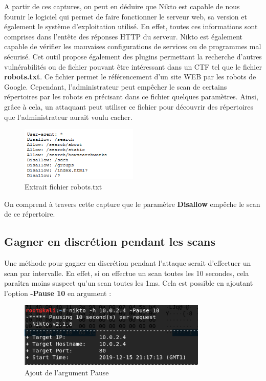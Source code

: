 A partir de ces captures, on peut en déduire que Nikto est capable de nous fournir le logiciel qui permet de faire fonctionner le serveur web, sa version et également le système d'exploitation utilisé. En effet, toutes ces informations sont comprises dans l'entête des réponses HTTP du serveur. Nikto est également capable de vérifier les mauvaises configurations de services ou de programmes mal sécurisé. Cet outil propose également des plugins permettant la recherche d'autres vulnérabilités ou de fichier pouvant être intéressant dans un CTF tel que le fichier \textbf{robots.txt}. Ce fichier permet le référencement d'un site WEB par les robots de Google. Cependant, l'administrateur peut empêcher le scan de certains répertoires par les robots en précisant dans ce fichier quelques paramètres. Ainsi, grâce à cela, un attaquant peut utiliser ce fichier pour découvrir des répertoires que l'administrateur aurait voulu cacher.

\begin{figure}[htp!]
  \centering
  \setlength\figureheight{7cm}
  \setlength\figurewidth{9cm}
  \includegraphics[width=0.5\textwidth]{oui/Ancien/imangeancien/Nikto/robots.PNG}
  \caption{Extrait fichier robots.txt}
  \label{fig:courbe-tikz}
\end{figure}

 On comprend à travers cette capture que le paramètre \textbf{Disallow} empêche le scan de ce répertoire.\\

\subsection{Gagner en discrétion pendant les scans}
Une méthode pour gagner en discrétion pendant l'attaque serait d'effectuer un scan par intervalle. En effet, si on effectue un scan toutes les 10 secondes, cela paraîtra moins suspect qu'un scan toutes les 1ms. Cela est possible en ajoutant l'option \textbf{-Pause 10} en argument :

\begin{figure}[htp!]
  \centering
  \setlength\figureheight{7cm}
  \setlength\figurewidth{9cm}
  \includegraphics[width=0.8\textwidth]{oui/Ancien/imangeancien/Nikto/nikto9.png}
  \caption{Ajout de l'argument Pause}
  \label{fig:courbe-tikz}
\end{figure}

